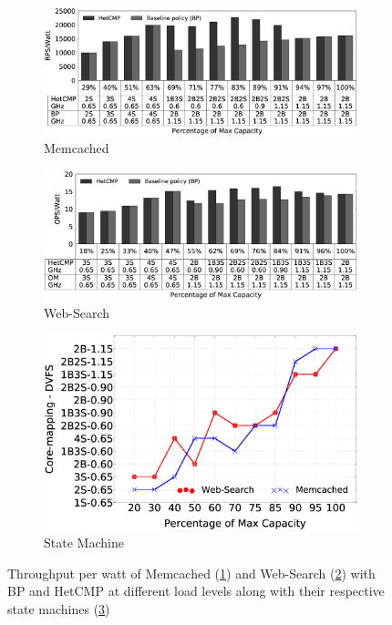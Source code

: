 \begin{figure}[htbp]
\begin{subfigure}{\textwidth}
  \centering
  \includegraphics[width=0.9\linewidth]{Chapter4/Figs/rps-watt-memcached.eps}
  \caption{Memcached}
  \label{fig: improvements}
\end{subfigure}
\begin{subfigure}{\textwidth}\ContinuedFloat
  \centering
  \includegraphics[width=0.9\linewidth]{Chapter4/Figs/rps-watt-websearch-new.eps}
  \caption{Web-Search}
  \label{fig: improvements-websearch}
\end{subfigure}
\begin{subfigure}{\textwidth}\ContinuedFloat
  \centering
  \includegraphics[width=0.9\linewidth]{Chapter4/Figs/state-transition.eps}
  \caption{State Machine}
  \label{fig: state-transition}
\end{subfigure}
    \caption[Throughput per watt of baseline policy vs heterogeneous platform with DVFS]{ Throughput per watt of Memcached (\ref{fig: improvements}) and Web-Search (\ref{fig: improvements-websearch}) with BP and HetCMP at different load levels along with their respective state machines (\ref{fig: state-transition})}
\label{fig:octomancomp}
\end{figure}

